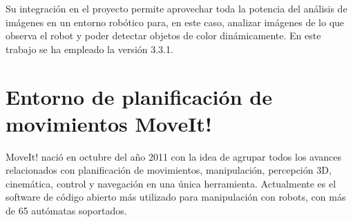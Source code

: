 \documentclass[12pt,spanish,chapterprefix, numbers=noenddot]{book}
\numberwithin{equation}{section}
\numberwithin{figure}{section}
\begin{document}
Su integración en el proyecto permite aprovechar toda la potencia del análisis de imágenes en un entorno robótico para, en este caso, analizar imágenes de lo que observa el robot y poder detectar objetos de color dinámicamente. En este trabajo se ha empleado la versión 3.3.1.

\section{Entorno de planificación de movimientos MoveIt!}
MoveIt! nació en octubre del año 2011 con la idea de agrupar todos los avances relacionados con planificación de movimientos, manipulación, percepción 3D, cinemática, control y navegación en una única herramienta. Actualmente es el software de código abierto más utilizado para manipulación con robots, con más de 65 autómatas soportados. 
\end{document}

